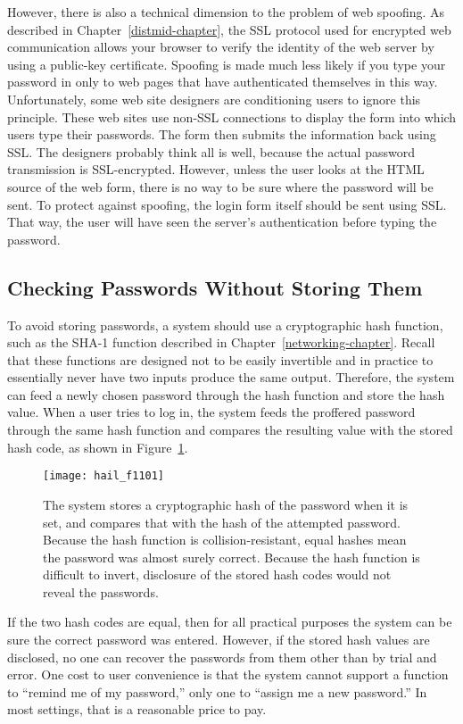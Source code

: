 However, there is also a technical dimension to the problem of web
spoofing.  As described in Chapter~\ref{distmid-chapter}, the SSL
protocol used for encrypted web communication allows your browser to
verify the identity of the web server by using a public-key
certificate.  Spoofing is made much less likely if you type your
password in only to web pages that have authenticated themselves in this
way.  Unfortunately, some web site designers are conditioning users to
ignore this principle.  These web sites use non-SSL connections to
display the form into which users type their passwords.  The form then
submits the information back using SSL.  The designers probably think
all is well, because the actual password transmission is
SSL-encrypted.  However, unless the user looks at the HTML
source of the web form, there is no way to be sure where the password
will be sent.  To protect against spoofing, the login form itself
should be sent using SSL.  That way, the user will have seen the
server's authentication before typing the password.

\subsection{Checking Passwords Without Storing Them}

To avoid storing passwords, a system should use a cryptographic hash
function, such as the SHA-1 function described in
Chapter~\ref{networking-chapter}.  Recall that these functions are
designed not to be easily invertible and in practice to essentially
never have two inputs produce the same output.  Therefore, the system
can feed a newly chosen password through the hash function and store
the hash value.  When a user tries to log in, the system feeds the
proffered password through the same hash function and compares the
resulting value with the stored hash code, as shown in
Figure~\ref{scan-11-1}.
\begin{figure}
\centerline{\texttt{[image: hail\_f1101]}}
\caption{The system stores a
  cryptographic hash of the password when it is set, and compares that
  with the hash of the attempted password.  Because the hash function
  is collision-resistant, equal hashes mean the password was almost
  surely correct.  Because the hash function is difficult to invert,
  disclosure of the stored hash codes would not reveal the passwords.}
\label{scan-11-1}
\end{figure}
If the two hash codes are equal, then
for all practical purposes the system can be sure the correct password
was entered. However, if the stored hash values are disclosed, no one can
recover the passwords from them other than by trial and error.  One cost to user convenience is that the
system cannot support a function to ``remind me of my password,'' only
one to ``assign me a new password.''  In most settings, that is a
reasonable price to pay.

